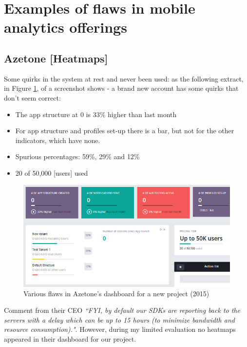 \section{Examples of flaws in mobile analytics offerings}
\subsection{Azetone [Heatmaps]}
Some quirks in the system at rest and never been used: as the following extract, in Figure \ref{fig:azetone_dashboard_flaws_for_kiwix_2015}, of a screenshot shows - a brand new account has some quirks that don’t seem correct:
\begin{itemize}
    \item The app structure at 0 is 33\% higher than last month
    \item For app structure and profiles set-up there is a bar, but not for the other indicators, which have none.
    \item Spurious percentages: 59\%, 29\% and 12\%
    \item 20 of 50,000 [users] used
\end{itemize}

\begin{figure}[ht]
    \centering
    \includegraphics[width=12cm]{images/azetone_dashboard_flaws_for_kiwix_2015.png}
    \caption{Various flaws in Azetone's dashboard for a new project (2015)}
    \label{fig:azetone_dashboard_flaws_for_kiwix_2015}
\end{figure}

Comment from their CEO \emph{``FYI, by default our SDKs are reporting back to the servers with a delay which can be up to 15 hours (to minimize bandwidth and resource consumption)."}. However, during my limited evaluation no heatmaps appeared in their dashboard for our project.
